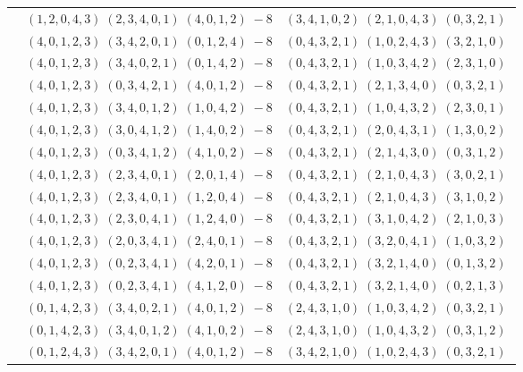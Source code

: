 \documentclass[11pt]{article}
\begin{document}
\begin{longtable}[l]{|c|c|c|}
 \cline{2-3} 
 & $(1 ,2 ,0 ,4 ,3) \;(2 ,3 ,4 ,0 ,1) \;(4 ,0 ,1 ,2) \;-8$ & $(3 ,4 ,1 ,0 ,2) \;(2 ,1 ,0 ,4 ,3) \;(0 ,3 ,2 ,1) \;$\\ 
 \cline{2-3} 
 & $(4 ,0 ,1 ,2 ,3) \;(3 ,4 ,2 ,0 ,1) \;(0 ,1 ,2 ,4) \;-8$ & $(0 ,4 ,3 ,2 ,1) \;(1 ,0 ,2 ,4 ,3) \;(3 ,2 ,1 ,0) \;$\\ 
 \cline{2-3} 
 & $(4 ,0 ,1 ,2 ,3) \;(3 ,4 ,0 ,2 ,1) \;(0 ,1 ,4 ,2) \;-8$ & $(0 ,4 ,3 ,2 ,1) \;(1 ,0 ,3 ,4 ,2) \;(2 ,3 ,1 ,0) \;$\\ 
 \cline{2-3} 
 & $(4 ,0 ,1 ,2 ,3) \;(0 ,3 ,4 ,2 ,1) \;(4 ,0 ,1 ,2) \;-8$ & $(0 ,4 ,3 ,2 ,1) \;(2 ,1 ,3 ,4 ,0) \;(0 ,3 ,2 ,1) \;$\\ 
 \cline{2-3} 
 & $(4 ,0 ,1 ,2 ,3) \;(3 ,4 ,0 ,1 ,2) \;(1 ,0 ,4 ,2) \;-8$ & $(0 ,4 ,3 ,2 ,1) \;(1 ,0 ,4 ,3 ,2) \;(2 ,3 ,0 ,1) \;$\\ 
 \cline{2-3} 
 & $(4 ,0 ,1 ,2 ,3) \;(3 ,0 ,4 ,1 ,2) \;(1 ,4 ,0 ,2) \;-8$ & $(0 ,4 ,3 ,2 ,1) \;(2 ,0 ,4 ,3 ,1) \;(1 ,3 ,0 ,2) \;$\\ 
 \cline{2-3} 
 & $(4 ,0 ,1 ,2 ,3) \;(0 ,3 ,4 ,1 ,2) \;(4 ,1 ,0 ,2) \;-8$ & $(0 ,4 ,3 ,2 ,1) \;(2 ,1 ,4 ,3 ,0) \;(0 ,3 ,1 ,2) \;$\\ 
 \cline{2-3} 
 & $(4 ,0 ,1 ,2 ,3) \;(2 ,3 ,4 ,0 ,1) \;(2 ,0 ,1 ,4) \;-8$ & $(0 ,4 ,3 ,2 ,1) \;(2 ,1 ,0 ,4 ,3) \;(3 ,0 ,2 ,1) \;$\\ 
 \cline{2-3} 
 & $(4 ,0 ,1 ,2 ,3) \;(2 ,3 ,4 ,0 ,1) \;(1 ,2 ,0 ,4) \;-8$ & $(0 ,4 ,3 ,2 ,1) \;(2 ,1 ,0 ,4 ,3) \;(3 ,1 ,0 ,2) \;$\\ 
 \cline{2-3} 
 & $(4 ,0 ,1 ,2 ,3) \;(2 ,3 ,0 ,4 ,1) \;(1 ,2 ,4 ,0) \;-8$ & $(0 ,4 ,3 ,2 ,1) \;(3 ,1 ,0 ,4 ,2) \;(2 ,1 ,0 ,3) \;$\\ 
 \cline{2-3} 
 & $(4 ,0 ,1 ,2 ,3) \;(2 ,0 ,3 ,4 ,1) \;(2 ,4 ,0 ,1) \;-8$ & $(0 ,4 ,3 ,2 ,1) \;(3 ,2 ,0 ,4 ,1) \;(1 ,0 ,3 ,2) \;$\\ 
 \cline{2-3} 
 & $(4 ,0 ,1 ,2 ,3) \;(0 ,2 ,3 ,4 ,1) \;(4 ,2 ,0 ,1) \;-8$ & $(0 ,4 ,3 ,2 ,1) \;(3 ,2 ,1 ,4 ,0) \;(0 ,1 ,3 ,2) \;$\\ 
 \cline{2-3} 
 & $(4 ,0 ,1 ,2 ,3) \;(0 ,2 ,3 ,4 ,1) \;(4 ,1 ,2 ,0) \;-8$ & $(0 ,4 ,3 ,2 ,1) \;(3 ,2 ,1 ,4 ,0) \;(0 ,2 ,1 ,3) \;$\\ 
 \cline{2-3} 
 & $(0 ,1 ,4 ,2 ,3) \;(3 ,4 ,0 ,2 ,1) \;(4 ,0 ,1 ,2) \;-8$ & $(2 ,4 ,3 ,1 ,0) \;(1 ,0 ,3 ,4 ,2) \;(0 ,3 ,2 ,1) \;$\\ 
 \cline{2-3} 
 & $(0 ,1 ,4 ,2 ,3) \;(3 ,4 ,0 ,1 ,2) \;(4 ,1 ,0 ,2) \;-8$ & $(2 ,4 ,3 ,1 ,0) \;(1 ,0 ,4 ,3 ,2) \;(0 ,3 ,1 ,2) \;$\\ 
 \cline{2-3} 
 & $(0 ,1 ,2 ,4 ,3) \;(3 ,4 ,2 ,0 ,1) \;(4 ,0 ,1 ,2) \;-8$ & $(3 ,4 ,2 ,1 ,0) \;(1 ,0 ,2 ,4 ,3) \;(0 ,3 ,2 ,1) \;$\\ 

\end{longtable}
\end{document}
